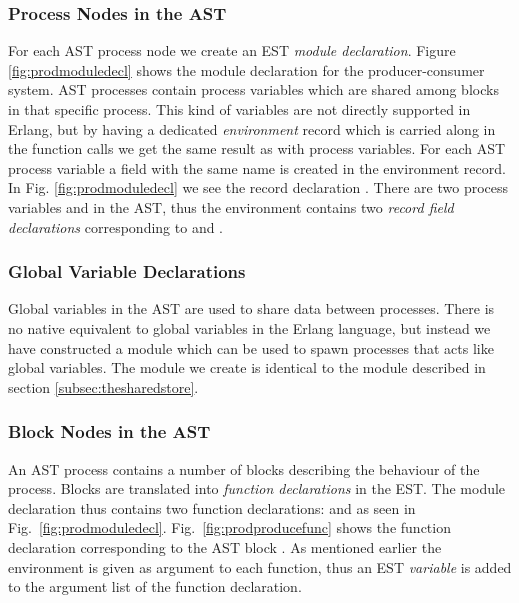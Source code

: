 \subsubsection{Process Nodes in the AST}
For each AST process node we create an EST \emph{module declaration}. Figure \ref{fig:prodmoduledecl} shows the  module declaration for the producer-consumer system. AST processes contain process variables which are shared among blocks in that specific process. This kind of variables are not directly supported in Erlang, but by having a dedicated \emph{environment} record which is carried along in the function calls we get the same result as with process variables. For each AST process variable a field with the same name is created in the environment record. In Fig. \ref{fig:prodmoduledecl} we see the record declaration . There are two process variables  and  in the AST, thus the environment contains two \emph{record field declarations} corresponding to  and .

\subsubsection{Global Variable Declarations}
Global variables in the AST are used to share data between processes. There is no native equivalent to global variables in the Erlang language, but instead we have constructed a module which can be used to spawn processes that acts like global variables. The module we create is identical to the module  described in section \ref{subsec:thesharedstore}.

\subsubsection{Block Nodes in the AST}
An AST process contains a number of blocks describing the behaviour of the process. Blocks are translated into \emph{function declarations} in the EST. The  module declaration thus contains two function declarations:   and  as seen in Fig.~\ref{fig:prodmoduledecl}. Fig.~\ref{fig:prodproducefunc} shows the function declaration corresponding to the AST block . As mentioned earlier the environment is given as argument to each function, thus an EST \emph{variable}  is added to the argument list of the function declaration. 

